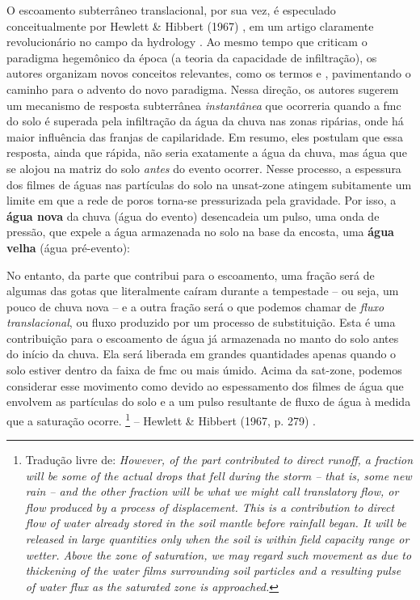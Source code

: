 \documentclass[./main.tex]{subfiles}
\begin{document}
\par O escoamento subterrâneo translacional, por sua vez, é especulado conceitualmente por Hewlett \& Hibbert (1967) \cite{Hewlett1967}, em um artigo claramente revolucionário no campo da \gls{hydrology} \cite{McDonnell2009}. Ao mesmo tempo que criticam o \gls{paradigma} hegemônico da época (a \gls{teoria} da capacidade de infiltração), os autores organizam novos conceitos relevantes, como os termos  e , pavimentando o caminho para o advento do novo \gls{paradigma}. Nessa direção, os autores sugerem um mecanismo de resposta subterrânea \textit{instantânea} que ocorreria quando a \gls{fmc} do solo é superada pela infiltração da água da chuva nas zonas ripárias, onde há maior influência das franjas de capilaridade. Em resumo, eles postulam que essa resposta, ainda que rápida, não seria exatamente a água da chuva, mas água que se alojou na matriz do solo \textit{antes} do evento ocorrer. Nesse processo, a espessura dos filmes de águas nas partículas do solo na \gls{unsat-zone} atingem subitamente um limite em que a rede de poros torna-se pressurizada pela gravidade. Por isso, a \textbf{água nova} da chuva (água do evento) desencadeia um pulso, uma onda de pressão, que expele a água armazenada no solo na base da encosta, uma \textbf{água velha} (água pré-evento):

\begin{adjustwidth}{100pt}{0pt}
\medskip
\small
No entanto, da parte que contribui para o escoamento, uma fração será de algumas das gotas que literalmente caíram durante a tempestade -- ou seja, um pouco de chuva nova -- e a outra fração será o que podemos chamar de \textit{fluxo translacional}, ou fluxo produzido por um processo de substituição. Esta é uma contribuição para o escoamento de água já armazenada no manto do solo antes do início da chuva. Ela será liberada em grandes quantidades apenas quando o solo estiver dentro da faixa de \gls{fmc} ou mais úmido. Acima da \gls{sat-zone}, podemos considerar esse movimento como devido ao espessamento dos filmes de água que envolvem as partículas do solo e a um pulso resultante de fluxo de água à medida que a saturação ocorre.
\footnote{Tradução livre de: 
\textit{
However, of the part contributed to direct runoff, a fraction will be some of the actual drops that fell during the storm -- that is, some new rain -- and the other fraction will be what we might call translatory flow, or flow produced by a process of displacement. This is a contribution to direct flow of water already stored in the soil mantle before rainfall began. It will be released in large quantities only when the soil is within field capacity range or wetter. Above the zone of saturation, we may regard such movement as due to thickening of the water films surrounding soil particles and a resulting pulse of water flux as the saturated zone is approached.
}} -- Hewlett \& Hibbert (1967, p. 279) \cite{Hewlett1967}.
\medskip
\end{adjustwidth}
\end{document}
